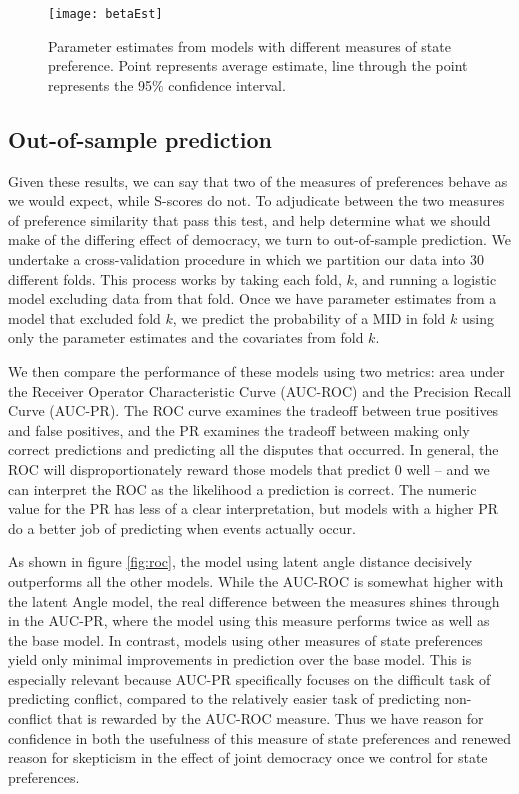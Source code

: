 \begin{figure}[ht]
	\centering
	\texttt{[image: betaEst]}
	\caption{Parameter estimates from models with different measures of state preference. Point represents average estimate, line through the point represents the 95\% confidence interval.}
	\label{fig:coefP}
\end{figure}
\FloatBarrier

\subsection*{Out-of-sample prediction}

Given these results, we can say that two of the measures of preferences behave as we would expect, while S-scores do not. To adjudicate between the two measures of preference similarity that pass this test, and help determine what we should make of the differing effect of democracy, we turn to out-of-sample prediction. We undertake a cross-validation procedure in which we partition our data into 30 different folds. This process works by taking each fold, $k$, and running a logistic model excluding data from that fold. Once we have parameter estimates from a model that excluded fold $k$, we predict the probability of a MID in fold $k$ using only the parameter estimates and the covariates from fold $k$.

We then compare the performance of these models using two metrics: area under the Receiver Operator Characteristic Curve (AUC-ROC) and the Precision Recall Curve (AUC-PR). The ROC curve examines the tradeoff between true positives and false positives, and the PR examines the tradeoff between making only correct predictions and predicting all the disputes that occurred. In general, the ROC will disproportionately reward those models that predict $0$ well -- and we can interpret the ROC as the likelihood a prediction is correct. The numeric value for the PR has less of a clear interpretation, but models with a higher PR do a better job of predicting when events actually occur.

As shown in figure \ref{fig:roc}, the model using latent angle distance decisively outperforms all the other models. While the AUC-ROC is somewhat higher with the latent Angle model, the real difference between the measures shines through in the AUC-PR, where the model using this measure performs twice as well as the base model. In contrast, models using other measures of state preferences yield only minimal improvements in prediction over the base model. This is especially relevant because AUC-PR specifically focuses on the difficult task of predicting conflict, compared to the relatively easier task of predicting non-conflict that is rewarded by the AUC-ROC measure. Thus we have reason for confidence in both the usefulness of this measure of state preferences and renewed reason for skepticism in the effect of joint democracy once we control for state preferences. 

